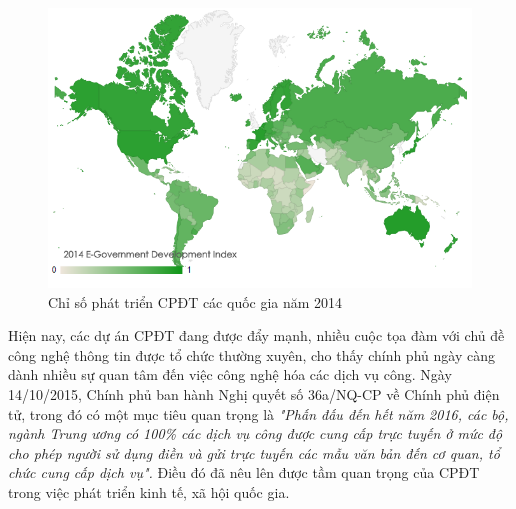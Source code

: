 \documentclass[a4paper]{article}
\begin{document}
\begin{center}
    \begin{figure}[htp]
    \begin{center}
     \includegraphics[scale=.8]{2014-edgi.PNG}
    \end{center}
    \caption{Chỉ số phát triển CPĐT các quốc gia năm 2014}
    \label{refhinh2}
    \end{figure}
\end{center}
Hiện nay, các dự án CPĐT đang được đẩy mạnh, nhiều cuộc tọa đàm với chủ đề công nghệ thông tin được tổ chức thường xuyên, cho thấy chính phủ ngày càng dành nhiều sự quan tâm đến việc công nghệ hóa các dịch vụ công. Ngày 14/10/2015, Chính phủ ban hành Nghị quyết số 36a/NQ-CP về Chính phủ điện tử, trong đó có một mục tiêu quan trọng là \textit{"Phấn đấu đến hết năm 2016, các bộ, ngành Trung ương có 100\% các dịch vụ công được cung cấp trực tuyến ở mức độ cho phép người sử dụng điền và gửi trực tuyến các mẫu văn bản đến cơ quan, tổ chức cung cấp dịch vụ".} Điều đó đã nêu lên được tầm quan trọng của CPĐT trong việc phát triển kinh tế, xã hội quốc gia. 
\end{document}
